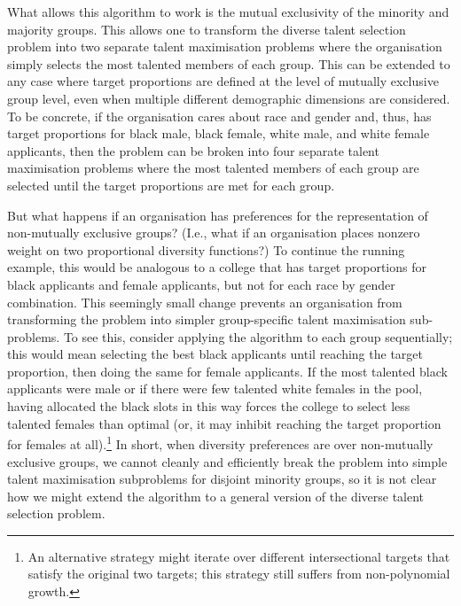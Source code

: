 What allows this algorithm to work is the mutual exclusivity of the minority and majority groups. This allows one to transform the diverse talent selection problem into two separate talent maximisation problems where the organisation simply selects the most talented members of each group. This can be extended to any case where target proportions are defined at the level of mutually exclusive group level, even when multiple different demographic dimensions are considered. To be concrete, if the organisation cares about race and gender and, thus, has target proportions for black male, black female, white male, and white female applicants, then the problem can be broken into four separate talent maximisation problems where the most talented members of each group are selected until the target proportions are met for each group. 

But what happens if an organisation has preferences for the representation of non-mutually exclusive groups? (I.e., what if an organisation places nonzero weight on two proportional diversity functions?) To continue the running example, this would be analogous to a college that has target proportions for black applicants and female applicants, but not for each race by gender combination. This seemingly small change prevents an organisation from transforming the problem into simpler group-specific talent maximisation sub-problems. To see this, consider applying the \textcite{kleinberg2018algorithmic} algorithm to each group sequentially; this would mean selecting the best black applicants until reaching the target proportion, then doing the same for female applicants. If the most talented black applicants were male or if there were few talented white females in the pool, having allocated the black slots in this way forces the college to select less talented females than optimal (or, it may inhibit reaching the target proportion for females at all).\footnote{An alternative strategy might iterate over different intersectional targets that satisfy the original two targets; this strategy still suffers from non-polynomial growth.} In short, when diversity preferences are over non-mutually exclusive groups, we cannot cleanly and efficiently break the problem into simple talent maximisation subproblems for disjoint minority groups, so it is not clear how we might extend the \textcite{kleinberg2018algorithmic} algorithm to a general version of the diverse talent selection problem. 

